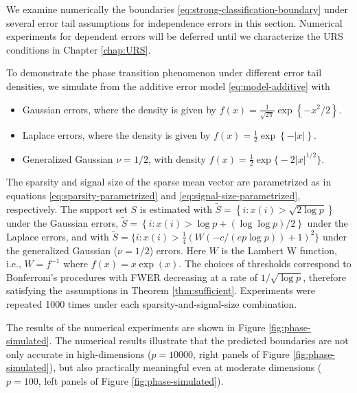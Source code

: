 
We examine numerically the boundaries \eqref{eq:strong-classification-boundary} under several error tail assumptions for independence errors in this section.
Numerical experiments for dependent errors will be deferred until we characterize the \ac{URS} conditions in Chapter \ref{chap:URS}.

To demonstrate the phase transition phenomenon under different error tail densities, we simulate from the additive error model \eqref{eq:model-additive} with
\begin{itemize}
    \item Gaussian errors, where the density is given by
    $f(x) = \frac{1}{\sqrt{2\pi}}\exp{\left\{-x^2/2\right\}}$.
    \item Laplace errors, where the density is given by $f(x) = \frac{1}{2}\exp{\left\{-\left|x\right|\right\}}$.
    \item Generalized Gaussian $\nu=1/2$, with density
    $f(x) = \frac{1}{2}\exp{\big\{-2\left|x\right|^{1/2}\big\}}$.
\end{itemize}
The sparsity and signal size of the sparse mean vector are parametrized as in equations \eqref{eq:sparsity-parametrized} and \eqref{eq:signal-size-parametrized}, respectively.
The support set $S$ is estimated with 
$\widetilde{S} = \left\{i:x(i)>\sqrt{2\log{p}}\right\}$ 
under the Gaussian errors, 
$\widetilde{S} = \left\{i:x(i)>\log{p} + (\log{\log{p}})/2\right\}$ 
under the Laplace errors, and with
$\widetilde{S} = \{i:x(i)> \frac{1}{4}\left(W\left(-c/(ep\log{p})\right) + 1\right)^2\}$
under the generalized Gaussian ($\nu = 1/2$) errors. Here $W$ is the Lambert W function, i.e., $W=f^{-1}$ where $f(x)=x\exp{(x)}$.
The choices of thresholds correspond to Bonferroni's procedures with FWER decreasing at a rate of $1/\sqrt{\log{p}}$, therefore satisfying the assumptions in Theorem \ref{thm:sufficient}.
Experiments were repeated 1000 times under each sparsity-and-signal-size combination.

The results of the numerical experiments are shown in Figure \ref{fig:phase-simulated}.
The numerical results illustrate that the predicted boundaries are not only accurate in high-dimensions ($p=10000$, right panels of Figure \ref{fig:phase-simulated}), but also practically meaningful even at moderate dimensions ($p=100$, left panels of Figure \ref{fig:phase-simulated}).

